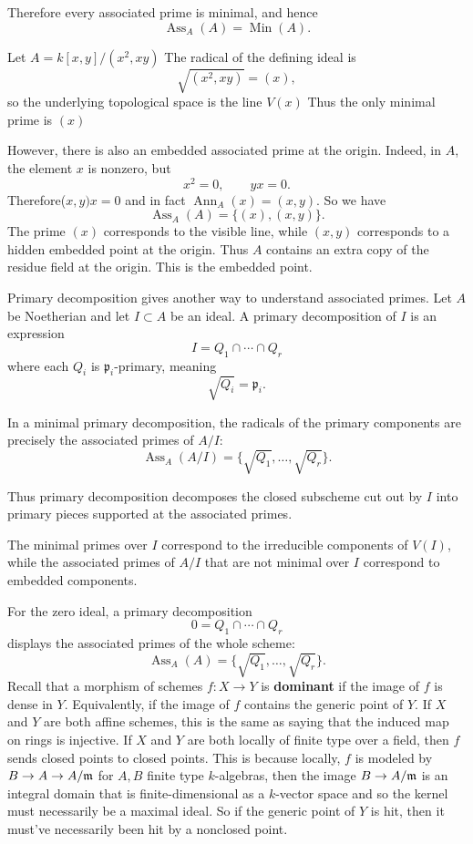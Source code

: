 \documentclass[12pt]{article}
\begin{document}
Therefore every associated prime is minimal, and hence
\[
    \operatorname{Ass}_A(A)=\operatorname{Min}(A).
\]
\begin{example}
    Let $A = k[x,y]/(x^2,xy)$
    The radical of the defining ideal is
    \[
        \sqrt{(x^2,xy)}=(x),
    \]
    so the underlying topological space is the line $V(x)$
    Thus the only minimal prime is $(x)$

    However, there is also an embedded associated prime at the origin. Indeed, in $A$, the element $x$ is nonzero, but
    \[
        x^2=0,
        \qquad
        yx=0.
    \]
    Therefore($x,y)x=0$ and in fact $\operatorname{Ann}_A(x)=(x,y)$. So we have
    \[
        \operatorname{Ass}_A(A)=\{(x),(x,y)\}.
    \]
    The prime $(x)$ corresponds to the visible line, while $(x,y)$ corresponds to a hidden embedded point at the origin. Thus $A$ contains an extra copy of the residue field at the origin. This is the embedded point.
\end{example}
Primary decomposition gives another way to understand associated primes. Let $A$ be Noetherian and let $I \subset A$ be an ideal. A primary decomposition of $I$ is an expression
\[
    I = Q_1 \cap \cdots \cap Q_r
\]
where each $Q_i$ is $\mathfrak p_i$-primary, meaning
\[
    \sqrt{Q_i}=\mathfrak p_i.
\]

In a minimal primary decomposition, the radicals of the primary components are precisely the associated primes of $A/I$:
\[
    \operatorname{Ass}_A(A/I)
    =
    \{\sqrt{Q_1},\dots,\sqrt{Q_r}\}.
\]

Thus primary decomposition decomposes the closed subscheme cut out by $I$ into primary pieces supported at the associated primes.

The minimal primes over $I$ correspond to the irreducible components of $V(I)$, while the associated primes of $A/I$ that are not minimal over $I$ correspond to embedded components.

For the zero ideal, a primary decomposition
\[
    0 = Q_1 \cap \cdots \cap Q_r
\]
displays the associated primes of the whole scheme:
\[
    \operatorname{Ass}_A(A)
    =
    \{\sqrt{Q_1},\dots,\sqrt{Q_r}\}.
\]
Recall that a morphism of schemes $f:X\to Y$ is \textbf{dominant} if the image of $f$ is dense in $Y$. Equivalently, if the image of $f$ contains the generic point of $Y$. If $X$ and $Y$ are both affine schemes, this is the same as saying that the induced map on rings is injective. If $X$ and $Y$ are both locally of finite type over a field, then $f$ sends closed points to closed points. This is because locally, $f$ is modeled by $B \to A \to A/\mathfrak{m}$ for $A,B$ finite type $k$-algebras, then the image $B\to A/\mathfrak{m}$ is an integral domain that is finite-dimensional as a $k$-vector space and so the kernel must necessarily be a maximal ideal. So if the generic point of $Y$ is hit, then it must've necessarily been hit by a nonclosed point.
\end{document}
